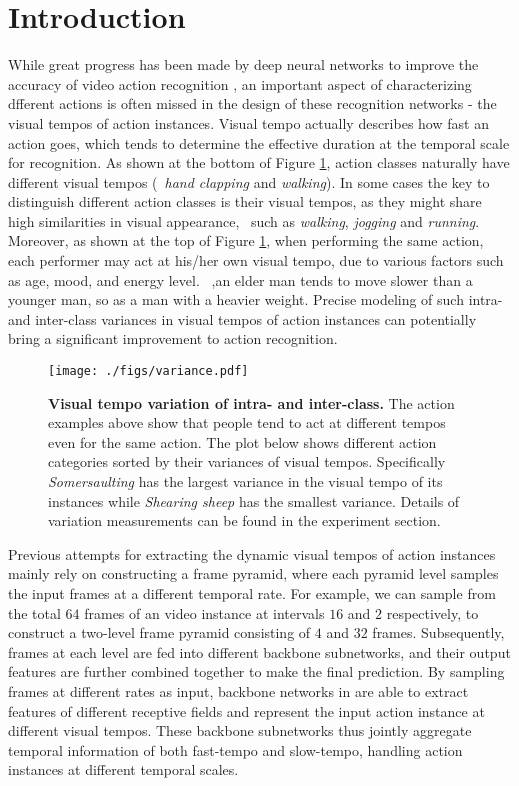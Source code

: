 \documentclass[10pt,twocolumn,letterpaper]{article}
\begin{document}
\section{Introduction}
\label{sec:intro}
While great progress has been made by deep neural networks to improve the accuracy of video action recognition \cite{slowfast, nonlocal, spn, trajconv, trajpool},
an important aspect of characterizing dfferent actions is often missed in the design of these recognition networks - the visual tempos of action instances. 
Visual tempo actually describes how fast an action goes, which tends to determine the effective duration at the temporal scale for recognition.
As shown at the bottom of Figure \ref{fig:variation}, action classes naturally have different visual tempos (\eg~\emph{hand clapping} and \emph{walking}).
In some cases the key to distinguish different action classes is their visual tempos, as they might share high similarities in visual appearance, \
such as \emph{walking}, \emph{jogging} and \emph{running}.
Moreover, as shown at the top of Figure \ref{fig:variation}, when performing the same action, each performer may act at his/her own visual tempo, due to various factors such as age, mood, and energy level.
\eg~,an elder man tends to move slower than a younger man, so as a man with a heavier weight.
Precise modeling of such intra- and inter-class variances in visual tempos of action instances can potentially bring a significant improvement to action recognition.


\begin{figure}[t]
    \centering
    \texttt{[image: ./figs/variance.pdf]}
    \caption{ 
        \textbf{Visual tempo variation of intra- and inter-class.}
        The action examples above show that people tend to act at different tempos even for the same action.
        The plot below shows different action categories sorted by their variances of visual tempos. 
        Specifically \emph{Somersaulting} has the largest variance in the visual tempo of its instances while \emph{Shearing sheep} has the smallest variance.
        Details of variation measurements can be found in the experiment section.
    }
    \label{fig:variation}
\end{figure}

Previous attempts \cite{slowfast, dtpn, spn} for extracting the dynamic visual tempos of action instances mainly rely on constructing a frame pyramid, 
where each pyramid level samples the input frames at a different temporal rate.
For example, we can sample from the total $64$ frames of an video instance at intervals $16$ and $2$ respectively, to construct a two-level frame pyramid consisting of $4$ and $32$ frames.
Subsequently, frames at each level are fed into different backbone subnetworks, and their output features are further combined together to make the final prediction. 
By sampling frames at different rates as input, backbone networks in \cite{slowfast, dtpn} are able to extract features of different receptive fields and represent the input action instance at different visual tempos.
These backbone subnetworks thus jointly aggregate temporal information of both fast-tempo and slow-tempo, handling action instances at different temporal scales.
\end{document}
